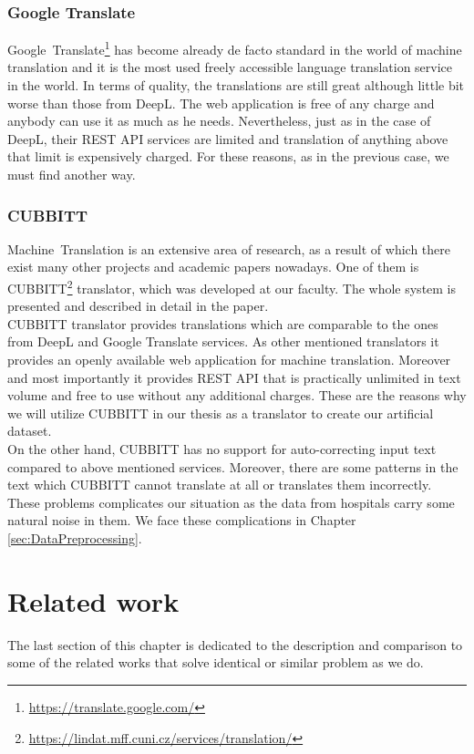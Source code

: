 \subsubsection{Google Translate}
Google~Translate\footnote[12]{\url{https://translate.google.com/}} has become already de facto standard in the world of machine translation and it is the most used freely accessible language translation service in the world. In terms of quality, the translations are still great although little bit worse than those from DeepL. The web application is free of any charge and anybody can use it as much as he needs. Nevertheless, just as in the case of DeepL, their REST API services are limited and translation of anything above that limit is expensively charged. For these reasons, as in the previous case, we must find another way.

\subsubsection{CUBBITT}
\label{sec:Cubbitt}
Machine~Translation\citep{akhbardeh2021findings} is an extensive area of research, as a result of which there exist many other projects and academic papers nowadays. One of them is CUBBITT\footnote[13]{\url{https://lindat.mff.cuni.cz/services/translation/}} translator, which was developed at our faculty. The whole system is presented and described in detail in the \citet{biblio:PoToTransformingmachine2020} paper. \\

CUBBITT translator provides translations which are comparable to the ones from DeepL and Google Translate services. As other mentioned translators it provides an openly available web application for machine translation. Moreover and most importantly it provides REST API that is practically unlimited in text volume and free to use without any additional charges. These are the reasons why we will utilize CUBBITT in our thesis as a translator to create our artificial dataset.\\

On the other hand, CUBBITT has no support for auto-correcting input text compared to above mentioned services. Moreover, there are some patterns in the text which CUBBITT cannot translate at all or translates them incorrectly. These problems complicates our situation as the data from hospitals carry some natural noise in them. We face these complications in Chapter \ref{sec:DataPreprocessing}.

\section{Related work}
\label{sec:RelatedWork}
The last section of this chapter is dedicated to the description and comparison to some of the related works that solve identical or similar problem as we do.\\


